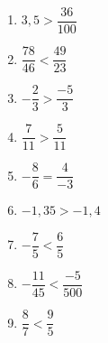 %
%
  \begin{enumerate}[cols=3]
    \item $3,5>\dfrac{36}{100}$
    \item $\dfrac{78}{46}<\dfrac{49}{23}$
    \item $-\dfrac{2}{3}>\dfrac{-5}{3}$
    \item $\dfrac{7}{11}>\dfrac{5}{11}$
    \item $-\dfrac{8}{6}=\dfrac{4}{-3}$
    \item $-1,35>-1,4$
    \item $-\dfrac{7}{5}<\dfrac{6}{5}$
    \item $-\dfrac{11}{45}<\dfrac{-5}{500}$
    \item $\dfrac{8}{7}<\dfrac{9}{5}$
  \end{enumerate}
